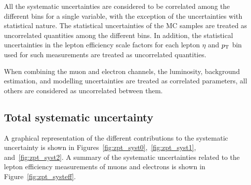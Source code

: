 All the systematic uncertainties are considered to be correlated among the 
different bins for a single variable, with the exception of the uncertainties with statistical nature. 
The statistical uncertainties of the MC{} samples are treated 
as uncorrelated quantities among the different bins. In addition, the statistical 
uncertainties in the lepton efficiency scale factors for each lepton $\eta$ and $p_{\mathrm{T}}$ 
bin used for such measurements are treated as uncorrelated quantities. 

When combining the muon and electron channels, the luminosity, background estimation, 
and modelling uncertainties are treated as correlated parameters, all others are 
considered as uncorrelated between them.

\subsection{Total systematic uncertainty} 

A graphical representation of the different contributions to the systematic uncertainty 
is shown in Figures~\ref{fig:zpt_syst0},~\ref{fig:zpt_syst1}, and~\ref{fig:zpt_syst2}. 
A summary of the systematic uncertainties related to the lepton efficiency measurements 
of muons and electrons is shown in Figure~\ref{fig:zpt_systeff}.

